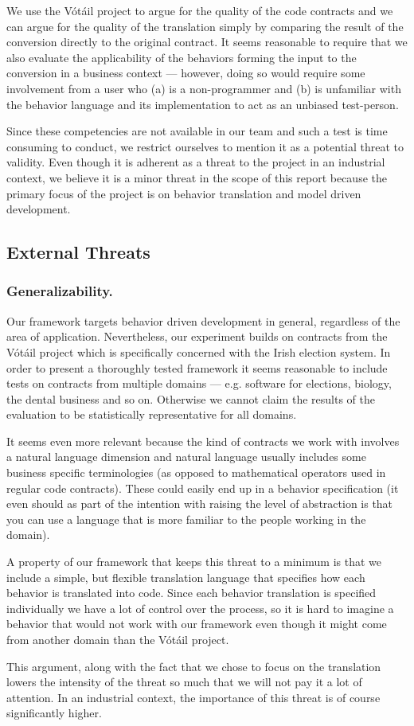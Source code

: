 We use the V\'{o}t\'{a}il project to argue for the quality of the code contracts and we can argue for the quality of the translation simply by comparing the result of the conversion directly to the original contract.
It seems reasonable to require that we also evaluate the applicability of the behaviors forming the input to the conversion in a business context --- however, doing so would require some involvement from a user who (a) is a non-programmer and (b) is unfamiliar with the behavior language and its implementation to act as an unbiased test-person.

Since these competencies are not available in our team and such a test is time consuming to conduct, we restrict ourselves to mention it as a potential threat to validity.
Even though it is adherent as a threat to the project in an industrial context, we believe it is a minor threat in the scope of this report because the primary focus of the project is on behavior translation and model driven development.

\subsection{External Threats}
\subsubsection{Generalizability.}
Our framework targets behavior driven development in general, regardless of the area of application.
Nevertheless, our experiment builds on contracts from the V\'{o}t\'{a}il project which is specifically concerned with the Irish election system.
In order to present a thoroughly tested framework it seems reasonable to include tests on contracts from multiple domains --- e.g. software for elections, biology, the dental business and so on.
Otherwise we cannot claim the results of the evaluation to be statistically representative for all domains.
 
It seems even more relevant because the kind of contracts we work with involves a natural language dimension and natural language usually includes some business specific terminologies (as opposed to mathematical operators used in regular code contracts).
These could easily end up in a behavior specification (it even should as part of the intention with raising the level of abstraction is that you can use a language that is more familiar to the people working in the domain).
 
A property of our framework that keeps this threat to a minimum is that we include a simple, but flexible translation language that specifies how each behavior is translated into code.
Since each behavior translation is specified individually we have a lot of control over the process, so it is hard to imagine a behavior that would not work with our framework even though it might come from another domain than the V\'{o}t\'{a}il project.
 
This argument, along with the fact that we chose to focus on the translation lowers the intensity of the threat so much that we will not pay it a lot of attention.
In an industrial context, the importance of this threat is of course significantly higher.